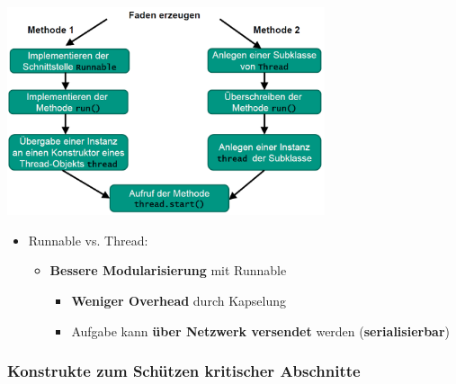 \documentclass[parskip=full, 12pt]{scrartcl}
\begin{document}
				\begin{center}
					\includegraphics[width=0.7\textwidth]{../images/ablaufParallelitaetJava.png}
				\end{center}
			
				\begin{itemize}
					\item Runnable vs. Thread:
					\begin{itemize}
						\item \textbf{Bessere Modularisierung} mit Runnable
						\begin{itemize}
							\item \textbf{Weniger Overhead} durch Kapselung
							\item Aufgabe kann \textbf{über Netzwerk versendet} werden (\textbf{serialisierbar})
						\end{itemize}
					\end{itemize}
				\end{itemize}
	
			\subsubsection{Konstrukte zum Schützen kritischer Abschnitte}
	
\end{document}
